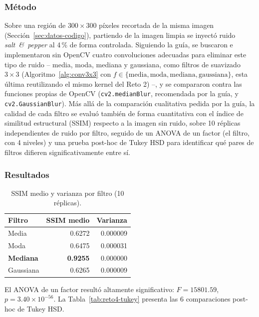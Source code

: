 \documentclass[11pt]{article}
\begin{document}
\subsubsection{Método}
Sobre una región de $300\times 300$ píxeles recortada de la misma imagen
(Sección~\ref{sec:datos-codigo}), partiendo de la imagen limpia se inyectó
ruido \emph{salt~\&~pepper} al 4\,\% de forma controlada. Siguiendo la
guía, se buscaron e implementaron sin OpenCV cuatro convoluciones
adecuadas para eliminar este tipo de ruido -- media, moda, mediana y
gaussiana, como filtros de suavizado $3\times 3$ (Algoritmo~\ref{alg:conv3x3}
con $f \in \{\text{media}, \text{moda}, \text{mediana}, \text{gaussiana}\}$,
esta última reutilizando el mismo kernel del Reto 2) --, y se compararon
contra las funciones propias de OpenCV (\texttt{cv2.medianBlur},
recomendada por la guía, y \texttt{cv2.GaussianBlur}). Más allá de la
comparación cualitativa pedida por la guía, la calidad de cada filtro se
evaluó también de forma cuantitativa con el índice de similitud
estructural (SSIM) \citep{wang2004ssim} respecto a la imagen sin ruido,
sobre 10 réplicas independientes de ruido por filtro, seguido de un ANOVA
de un factor (el filtro, con 4 niveles) y una prueba post-hoc de Tukey HSD
para identificar qué pares de filtros difieren significativamente entre
sí.

\subsubsection{Resultados}

\begin{table}[h]
\centering
\caption{SSIM medio y varianza por filtro (10 réplicas).}
\label{tab:reto4-anova}
\begin{tabular}{lrr}
\toprule
Filtro & SSIM medio & Varianza \\
\midrule
Media & 0.6272 & 0.000009 \\
Moda & 0.6475 & 0.000031 \\
\textbf{Mediana} & \textbf{0.9255} & 0.000000 \\
Gaussiana & 0.6265 & 0.000009 \\
\bottomrule
\end{tabular}
\end{table}

El ANOVA de un factor resultó altamente significativo: $F = 15801.59$,
$p = 3.40\times 10^{-56}$. La Tabla~\ref{tab:reto4-tukey} presenta las 6
comparaciones post-hoc de Tukey HSD.
\end{document}
